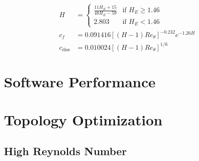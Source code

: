 \documentclass{article}
\begin{document}
\begin{align}
    H &= \begin{cases}
        \frac{11 H_E + 15}{48H_E - 59} & \text{if } H_E  \ge 1.46 \\
        2.803 & \text{if } H_E < 1.46
    \end{cases} \\
    c_f &= 0.091416\left[(H-1)Re_\theta \right]^{-0.232}e^{-1.26H} \\
    c_\text{diss} &= 0.010024\left[(H-1)Re_\theta \right]^{1/6}
\end{align}

\section{Software Performance}

\section{Topology Optimization}

\subsection{High Reynolds Number}
\end{document}
